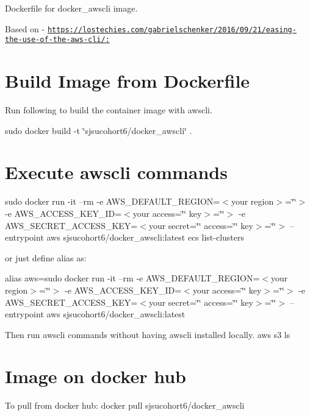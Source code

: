 Dockerfile for docker\+\_\+awscli image.

Based on -\/ \href{https://lostechies.com/gabrielschenker/2016/09/21/easing-the-use-of-the-aws-cli/:}{\tt https\+://lostechies.\+com/gabrielschenker/2016/09/21/easing-\/the-\/use-\/of-\/the-\/aws-\/cli/\+:}

\section*{Build Image from Dockerfile}

Run following to build the container image with awscli.

sudo docker build -\/t \char`\"{}sjsucohort6/docker\+\_\+awscli\char`\"{} .

\section*{Execute awscli commands}

sudo docker run -\/it --rm -\/e A\+W\+S\+\_\+\+D\+E\+F\+A\+U\+L\+T\+\_\+\+R\+E\+G\+I\+ON=\textquotesingle{}$<$your region$>$=\char`\"{}\char`\"{}$>$\textquotesingle{} -\/e A\+W\+S\+\_\+\+A\+C\+C\+E\+S\+S\+\_\+\+K\+E\+Y\+\_\+\+ID=\textquotesingle{}$<$your access=\char`\"{}\char`\"{} key$>$=\char`\"{}\char`\"{}$>$\textquotesingle{} -\/e A\+W\+S\+\_\+\+S\+E\+C\+R\+E\+T\+\_\+\+A\+C\+C\+E\+S\+S\+\_\+\+K\+EY=\textquotesingle{}$<$your secret=\char`\"{}\char`\"{} access=\char`\"{}\char`\"{} key$>$=\char`\"{}\char`\"{}$>$\textquotesingle{} --entrypoint aws sjsucohort6/docker\+\_\+awscli\+:latest ecs list-\/clusters

or just define alias as\+:

alias aws=sudo docker run -\/it --rm -\/e A\+W\+S\+\_\+\+D\+E\+F\+A\+U\+L\+T\+\_\+\+R\+E\+G\+I\+ON=\textquotesingle{}$<$your region$>$=\char`\"{}\char`\"{}$>$\textquotesingle{} -\/e A\+W\+S\+\_\+\+A\+C\+C\+E\+S\+S\+\_\+\+K\+E\+Y\+\_\+\+ID=\textquotesingle{}$<$your access=\char`\"{}\char`\"{} key$>$=\char`\"{}\char`\"{}$>$\textquotesingle{} -\/e A\+W\+S\+\_\+\+S\+E\+C\+R\+E\+T\+\_\+\+A\+C\+C\+E\+S\+S\+\_\+\+K\+EY=\textquotesingle{}$<$your secret=\char`\"{}\char`\"{} access=\char`\"{}\char`\"{} key$>$=\char`\"{}\char`\"{}$>$\textquotesingle{} --entrypoint aws sjsucohort6/docker\+\_\+awscli\+:latest

Then run awscli commands without having awscli installed locally. aws s3 ls

\section*{Image on docker hub}

To pull from docker hub\+: docker pull sjsucohort6/docker\+\_\+awscli 